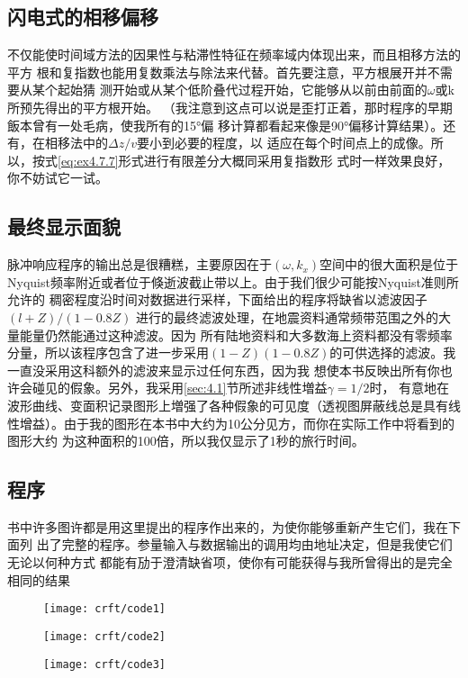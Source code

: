 \subsection{闪电式的相移偏移}
\label{sec:4.7.5}

不仅能使时间域方法的因果性与粘滞性特征在频率域内体现出来，而且相移方法的平方
根和复指数也能用复数乘法与除法来代替。首先要注意，平方根展开并不需要从某个起始猜
测开始或从某个低阶叠代过程开始，它能够从以前由前面的$\omega$或k所预先得出的平方根开始。
（我注意到这点可以说是歪打正着，那时程序的早期飯本曾有一处毛病，使我所有的15°偏
移计算都看起来像是90°偏移计算结果）。还有，在相移法中的$\Delta z/v$要小到必要的程度，以
适应在每个时间点上的成像。所以，按式\ref{eq:ex4.7.7}形式进行有限差分大概同采用复指数形
式时一样效果良好，你不妨试它一试。

\subsection{最终显示面貌}
\label{sec:4.7.6}

脉冲响应程序的输出总是很糟糕，主要原因在于$(\omega,k_x)$空间中的很大面积是位于
Nyquist频率附近或者位于倏逝波截止带以上。由于我们很少可能按Nyquist准则所允许的
稠密程度沿时间对数据进行采样，下面给出的程序将缺省以滤波因子$(l + Z)/( 1
-0.8Z)$
进行的最终滤波处理，在地震资料通常频带范围之外的大量能量仍然能通过这种滤波。因为
所有陆地资料和大多数海上资料都没有零频率分量，所以该程序包含了进一步采用$(1
-Z)(1-0.8Z)$的可供选择的滤波。我一直没采用这科额外的滤波来显示过任何东西，因为我
想使本书反映出所有你也许会碰见的假象。另外，我采用\ref{sec:4.1}节所述非线性増益$\gamma=1/2$时，
有意地在波形曲线、变面积记录图形上増强了各种假象的可见度（透视图屏蔽线总是具有线
性增益）。由于我的图形在本书中大约为10公分见方，而你在实际工作中将看到的图形大约
为这种面积的100倍，所以我仅显示了1秒的旅行时间。



\subsection{程序}
\label{sec:4.7.7}

书中许多图许都是用这里提出的程序作出来的，为使你能够重新产生它们，我在下面列
出了完整的程序。参量输入与数据输出的调用均由地址决定，但是我使它们无论以何种方式
都能有劢于澄清缺省项，使你有可能获得与我所曾得出的是完全相同的结果

\begin{figure}[H]
\centering
\texttt{[image: crft/code1]}
\label{fig:crft/code1}
\end{figure}
\begin{figure}[H]
\centering
\texttt{[image: crft/code2]}
\label{fig:crft/code2}
\end{figure}
\begin{figure}[H]
\centering
\texttt{[image: crft/code3]}
\label{fig:crft/code3}
\end{figure}

